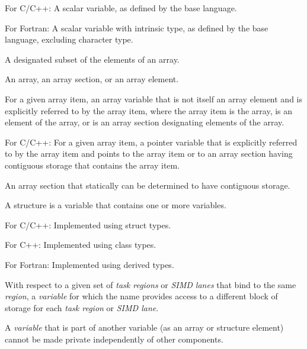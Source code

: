 \glossarydefstart
For C/C++:
\nopagebreak
A scalar variable, as defined by the base language.

For Fortran:
\nopagebreak
A scalar variable with intrinsic type, as defined by the base language,
excluding character type.
\glossarydefend


\glossarydefstart
A designated subset of the elements of an array. 
\glossarydefend

\glossarydefstart
An array, an array section, or an array element.
\glossarydefend

\glossarydefstart
For a given array item, an array variable that is not itself an array element
and is explicitly referred to by the array item, where the array item is the
array, is an element of the array, or is an array section designating elements
of the array.
\glossarydefend

\glossarydefstart
For C/C++:
\nopagebreak
For a given array item, a pointer variable that is explicitly referred to by
the array item and points to the array item or to an array section having
contiguous storage that contains the array item.
\glossarydefend

\glossarydefstart
An array section that statically can be determined to have contiguous storage.
\glossarydefend
\bigskip

\glossarydefstart
A structure is a variable that contains one or more variables. 

For C/C++: 
\nopagebreak
Implemented using struct types.

For C++: 
\nopagebreak
Implemented using class types.        

For Fortran: 
\nopagebreak
Implemented using derived types.        
\glossarydefend

\glossarydefstart
With respect to a given set of \emph{task regions} or \emph{SIMD lanes} that bind to the same
 \emph{region}, a \emph{variable} for which the name provides access to a different block of 
storage for each \emph{task region} or \emph{SIMD lane}.

A \emph{variable} that is part of another variable (as an array or structure element) cannot 
be made private independently of other components.
\glossarydefend

